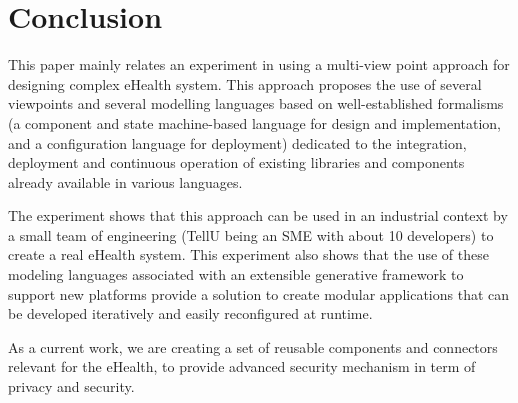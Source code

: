\section{Conclusion}

This paper mainly relates an experiment in using a multi-view point approach for designing complex eHealth system. This approach proposes the use of several viewpoints and several modelling languages based on well-established formalisms (a component and state machine-based language for design and implementation, and a configuration language for deployment) dedicated to the integration, deployment and continuous operation of existing libraries and components already available in various languages. 

The experiment shows that this approach can be used in an industrial context by a small team of engineering (TellU being an SME with about 10 developers) to create a real eHealth system. This experiment also shows that the use of these modeling languages associated with an extensible generative framework to support new platforms provide a solution to create modular applications that can be developed iteratively and easily reconfigured at runtime. 

As a current work, we are creating a set of reusable components and connectors relevant for the eHealth, to provide advanced security mechanism in term of privacy and security. 